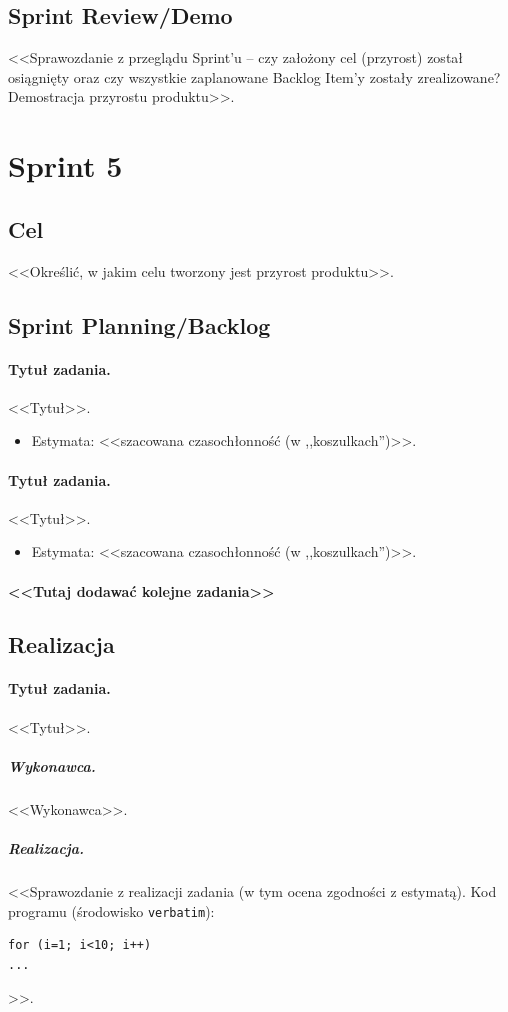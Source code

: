 \documentclass[a4paper]{article}
\begin{document}
\subsection{Sprint Review/Demo}
<<Sprawozdanie z przeglądu Sprint'u -- czy założony cel (przyrost) został osiągnięty oraz czy wszystkie zaplanowane Backlog Item'y zostały zrealizowane? Demostracja przyrostu produktu>>.

\section{Sprint 5}

\subsection{Cel} <<Określić, w jakim celu tworzony jest przyrost produktu>>.

\subsection{Sprint Planning/Backlog}

\paragraph{Tytuł zadania.} <<Tytuł>>.
\begin{itemize}
\item Estymata: <<szacowana czasochłonność (w ,,koszulkach'')>>.
\end{itemize}

\paragraph{Tytuł zadania.} <<Tytuł>>.
\begin{itemize}
\item Estymata: <<szacowana czasochłonność (w ,,koszulkach'')>>.
\end{itemize}

\paragraph{<<Tutaj dodawać kolejne zadania>>}

\subsection{Realizacja}

\paragraph{Tytuł zadania.} <<Tytuł>>.
\subparagraph{Wykonawca.} <<Wykonawca>>.
\subparagraph{Realizacja.} <<Sprawozdanie z realizacji zadania (w tym ocena zgodności z estymatą). Kod programu (środowisko \texttt{verbatim}): \begin{verbatim}
for (i=1; i<10; i++)
...
\end{verbatim}>>.
\end{document}
